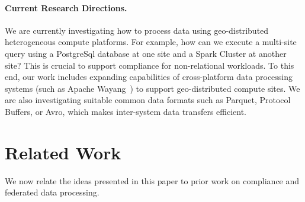 \documentclass[11pt]{article}
\begin{document}
\paragraph{Current Research Directions.} We are currently 
investigating how to process data using geo-distributed
heterogeneous compute platforms. For example, how can we
execute a multi-site query using a PostgreSql database at
one site and a Spark Cluster at another site? This is
crucial to support compliance for non-relational workloads.
To this end, our work includes expanding capabilities of
cross-platform data processing systems (such as Apache
Wayang~\cite{rheem}) to support geo-distributed compute
sites. We are also investigating suitable common data
formats such as Parquet, Protocol Buffers, or Avro, which
makes inter-system data transfers efficient.



\section{Related Work} %
\label{sec:related_work}

We now relate the ideas presented in this paper to prior
work on compliance and federated data processing.
\end{document}
